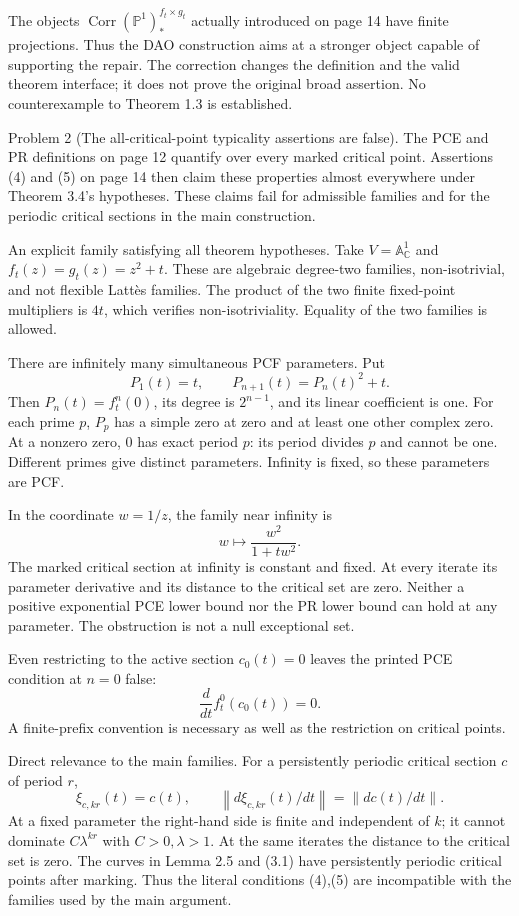 \documentclass[10pt]{article}
\begin{document}
The objects \(\operatorname{Corr}(\mathbb P^1)^{f_t\times g_t}_*\) actually introduced on page 14 have finite projections. Thus the DAO construction aims at a stronger object capable of supporting the repair. The correction changes the definition and the valid theorem interface; it does not prove the original broad assertion. No counterexample to Theorem 1.3 is established.\par
Problem 2 (The all-critical-point typicality assertions are false).  The PCE and PR definitions on page 12 quantify over every marked critical point. Assertions (4) and (5) on page 14 then claim these properties almost everywhere under Theorem 3.4’s hypotheses. These claims fail for admissible families and for the periodic critical sections in the main construction.\par
An explicit family satisfying all theorem hypotheses. Take \(V=\mathbb A^1_\mathbb C\) and \(f_t(z)=g_t(z)=z^2+t\). These are algebraic degree-two families, non-isotrivial, and not flexible Lattès families. The product of the two finite fixed-point multipliers is \(4t\), which verifies non-isotriviality. Equality of the two families is allowed.\par
There are infinitely many simultaneous PCF parameters. Put \[P_1(t)=t,\qquad P_{n+1}(t)=P_n(t)^2+t.\] Then \(P_n(t)=f_t^n(0)\), its degree is \(2^{n-1}\), and its linear coefficient is one. For each prime \(p\), \(P_p\) has a simple zero at zero and at least one other complex zero. At a nonzero zero, \(0\) has exact period \(p\): its period divides \(p\) and cannot be one. Different primes give distinct parameters. Infinity is fixed, so these parameters are PCF.\par
In the coordinate \(w=1/z\), the family near infinity is \[w\longmapsto \frac{w^2}{1+tw^2}.\] The marked critical section at infinity is constant and fixed. At every iterate its parameter derivative and its distance to the critical set are zero. Neither a positive exponential PCE lower bound nor the PR lower bound can hold at any parameter. The obstruction is not a null exceptional set.\par
Even restricting to the active section \(c_0(t)=0\) leaves the printed PCE condition at \(n=0\) false: \[\frac{d}{dt}f_t^0(c_0(t))=0.\] A finite-prefix convention is necessary as well as the restriction on critical points.\par
Direct relevance to the main families. For a persistently periodic critical section \(c\) of period \(r\), \[\xi_{c,kr}(t)=c(t),\qquad
 \left\|d\xi_{c,kr}(t)/dt\right\|=\left\|dc(t)/dt\right\|.\] At a fixed parameter the right-hand side is finite and independent of \(k\); it cannot dominate \(C\lambda^{kr}\) with \(C>0,\lambda>1\). At the same iterates the distance to the critical set is zero. The curves in Lemma 2.5 and (3.1) have persistently periodic critical points after marking. Thus the literal conditions (4),(5) are incompatible with the families used by the main argument.\par
\end{document}
